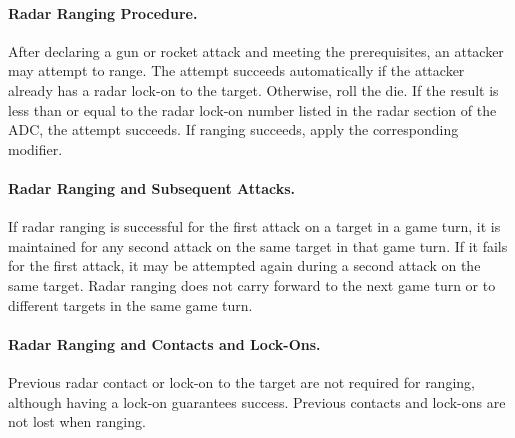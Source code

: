 \begin{advancedrules}
{\begin{itemize}
\end{itemize}

\paragraph{Radar Ranging Procedure.} After declaring a gun or rocket attack and meeting the prerequisites, an attacker may attempt to range. The attempt succeeds automatically if the attacker already has a radar lock-on to the target. Otherwise, roll the die. If the result is less than or equal to the radar lock-on number listed in the radar section of the ADC, the attempt succeeds. If ranging succeeds, apply the corresponding modifier.

\paragraph{Radar Ranging and Subsequent Attacks.} If radar ranging is successful for the first attack on a target in a game turn, it is maintained for any second attack on the same target in that game turn. If it fails for the first attack, it may be attempted again during a second attack on the same target. Radar ranging does not carry forward to the next game turn or to different targets in the same game turn.

\paragraph{Radar Ranging and Contacts and Lock-Ons.}
Previous radar contact or lock-on to the target are not required for ranging, although having a lock-on guarantees success. Previous contacts and lock-ons are not lost when ranging. 

}



\end{advancedrules}
